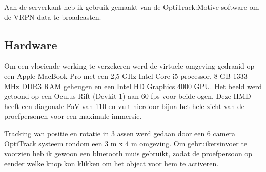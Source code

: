 Aan de serverkant heb ik gebruik gemaakt van de OptiTrack:Motive software om de
VRPN data te broadcasten.


\subsection{Hardware}
Om een vloeiende werking te verzekeren werd de virtuele omgeving gedraaid op een
Apple MacBook Pro met een 2,5 GHz Intel Core i5 processor, 8 GB 1333 MHz DDR3 RAM
geheugen en een Intel HD Graphics 4000 GPU. Het beeld werd getoond op een Oculus 
Rift (Devkit 1) aan 60 fps voor beide ogen. Deze HMD heeft een diagonale FoV van 
110\textdegree{} en vult hierdoor bijna het hele zicht van de proefpersonen voor 
een maximale immersie.

Tracking van positie en rotatie in 3 assen werd gedaan door een 6 camera
OptiTrack systeem rondom een 3 m x 4 m omgeving. Om gebruikersinvoer te voorzien 
heb ik gewoon een bluetooth muis gebruikt, zodat de proefpersoon op eender welke 
knop kon klikken om het object voor hem te activeren.